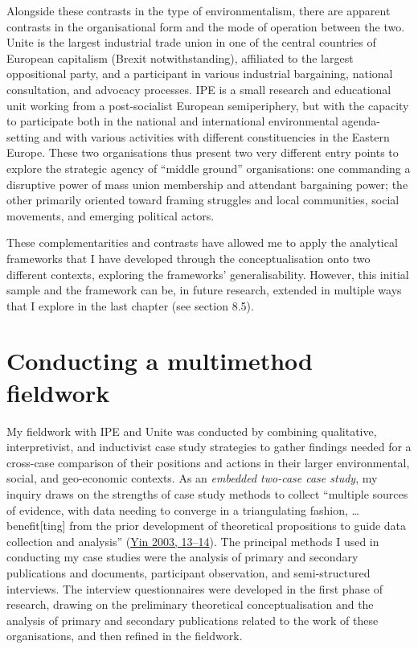 \documentclass[a4paper, nobind]{templates/ociamthesis}
\begin{document}
Alongside these contrasts in the type of environmentalism, there are apparent contrasts in the organisational form and the mode of operation between the two. Unite is the largest industrial trade union in one of the central countries of European capitalism (Brexit notwithstanding), affiliated to the largest oppositional party, and a participant in various industrial bargaining, national consultation, and advocacy processes. IPE is a small research and educational unit working from a post-socialist European semiperiphery, but with the capacity to participate both in the national and international environmental agenda-setting and with various activities with different constituencies in the Eastern Europe. These two organisations thus present two very different entry points to explore the strategic agency of ``middle ground'' organisations: one commanding a disruptive power of mass union membership and attendant bargaining power; the other primarily oriented toward framing struggles and local communities, social movements, and emerging political actors.

These complementarities and contrasts have allowed me to apply the analytical frameworks that I have developed through the conceptualisation onto two different contexts, exploring the frameworks' generalisability. However, this initial sample and the framework can be, in future research, extended in multiple ways that I explore in the last chapter (see section 8.5).

\hypertarget{conducting-a-multimethod-fieldwork}{%
\section{Conducting a multimethod fieldwork}\label{conducting-a-multimethod-fieldwork}}

My fieldwork with IPE and Unite was conducted by combining qualitative, interpretivist, and inductivist case study strategies to gather findings needed for a cross-case comparison of their positions and actions in their larger environmental, social, and geo-economic contexts. As an \emph{embedded two-case case study}, my inquiry draws on the strengths of case study methods to collect ``multiple sources of evidence, with data needing to converge in a triangulating fashion, \ldots{} benefit{[}ting{]} from the prior development of theoretical propositions to guide data collection and analysis'' (\protect\hyperlink{ref-yin_case_2003}{Yin 2003, 13--14}). The principal methods I used in conducting my case studies were the analysis of primary and secondary publications and documents, participant observation, and semi-structured interviews. The interview questionnaires were developed in the first phase of research, drawing on the preliminary theoretical conceptualisation and the analysis of primary and secondary publications related to the work of these organisations, and then refined in the fieldwork.
\end{document}
